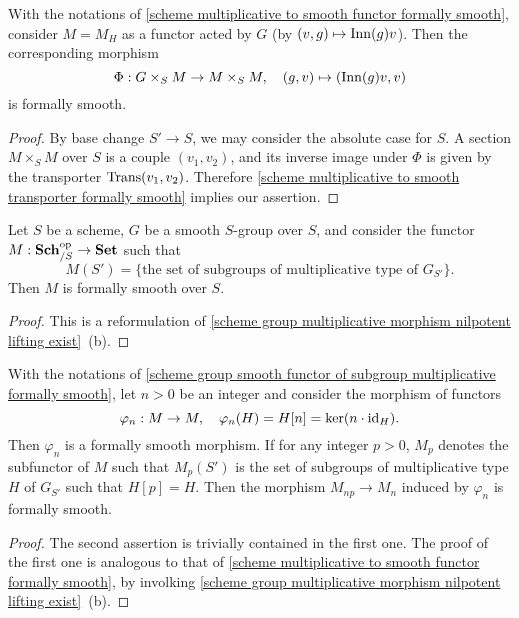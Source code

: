 \begin{corollary}\label{scheme multiplicative to smooth action morphism formally smooth}
With the notations of \cref{scheme multiplicative to smooth functor formally smooth}, consider $M=M_H$ as a functor acted by $G$ (by $(v,g)\mapsto\mathrm{Inn}(g)v$). Then the corresponding morphism
\[\Phi:G\times_SM\to M\times_SM,\quad (g,v)\mapsto(\mathrm{Inn}(g)v,v)\]
is formally smooth.
\end{corollary}
\begin{proof}
By base change $S'\to S$, we may consider the absolute case for $S$. A section $M\times_SM$ over $S$ is a couple $(v_1,v_2)$, and its inverse image under $\Phi$ is given by the transporter $\mathrm{Trans}(v_1,v_2)$. Therefore \cref{scheme multiplicative to smooth transporter formally smooth} implies our assertion.
\end{proof}

\begin{proposition}\label{scheme group smooth functor of subgroup multiplicative formally smooth}
Let $S$ be a scheme, $G$ be a smooth $S$-group over $S$, and consider the functor $M:\mathbf{Sch}_{/S}^{\mathrm{op}}\to\mathbf{Set}$ such that
\[M(S')=\{\text{the set of subgroups of multiplicative type of $G_{S'}$}\}.\]
Then $M$ is formally smooth over $S$.
\end{proposition}
\begin{proof}
This is a reformulation of \cref{scheme group multiplicative morphism nilpotent lifting exist}~(b).
\end{proof}

\begin{corollary}\label{scheme group smooth functor of subgroup n-torsion multiplicative formally smooth}
With the notations of \cref{scheme group smooth functor of subgroup multiplicative formally smooth}, let $n>0$ be an integer and consider the morphism of functors
\[\varphi_n:M\to M,\quad \varphi_n(H)=H[n]=\operatorname{ker}(n\cdot\operatorname{id}_H).\]
Then $\varphi_n$ is a formally smooth morphism. If for any integer $p>0$, $M_p$ denotes the subfunctor of $M$ such that $M_p(S')$ is the set of subgroups of multiplicative type $H$ of $G_{S'}$ such that $H[p]=H$. Then the morphism $M_{np}\to M_n$ induced by $\varphi_n$ is formally smooth.
\end{corollary}
\begin{proof}
The second assertion is trivially contained in the first one. The proof of the first one is analogous to that of \cref{scheme multiplicative to smooth functor formally smooth}, by involking \cref{scheme group multiplicative morphism nilpotent lifting exist}~(b).
\end{proof}


